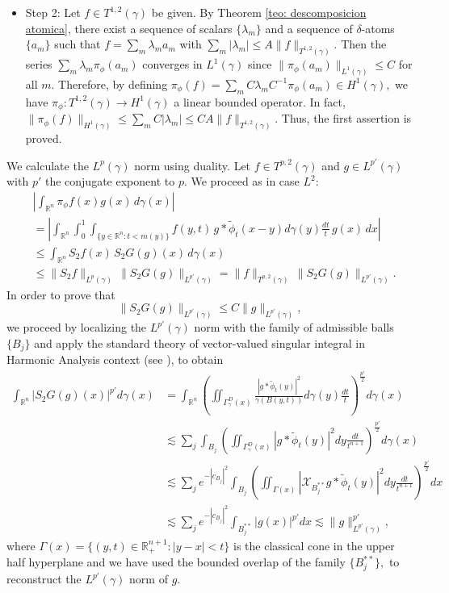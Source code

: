 \documentclass[leqno,11pt]{amsart}
\theoremstyle{plain}
\theoremstyle{remark}
\begin{document}
{{\begin{itemize}
\begin{itemize}
\end{itemize}

\item Step 2: Let $f\in T^{1,2}(\gamma)$ be given. By Theorem \ref{teo: descomposicion atomica}, there exist a sequence of scalars $\{\lambda_m\}$ and a sequence of $\delta$-atoms $\{a_m\}$ such that $f=\sum_m \lambda_m a_m$ with $\sum_m |\lambda_m|\le A \|f\|_{T^{1,2}(\gamma)}.$ Then the series $\sum_m \lambda_m \pi_\phi (a_m)$ converges in $L^1(\gamma)$ since $\|\pi_\phi(a_m)\|_{L^1(\gamma)}\le C$ for all $m.$ Therefore, by defining $\pi_\phi(f)=\sum_m C\lambda_m  C^{-1}\pi_\phi (a_m)\in H^1(\gamma),$ we have $\pi_\phi:T^{1,2}(\gamma)\to H^1(\gamma)$ a linear bounded operator. In fact, $\|\pi_\phi (f)\|_{H^1(\gamma)}\le \sum_m C|\lambda_m|\le C A \|f\|_{T^{1,2}(\gamma)}.$
Thus, the first assertion is proved.

\end{itemize}
 

 We calculate the $L^p(\gamma)$ norm using duality. Let $f\in T^{p,2}(\gamma)$ and $g\in L^{p'}(\gamma)$ with $p'$ the conjugate exponent to $p.$ We proceed as in case $L^2$:
\begin{align*}
&\left|\int_{\mathbb{R}^{n}}  \pi_\phi f(x) g(x)\, d\gamma(x)\right|\\&=\left|\int_{\mathbb{R}^n}\int_0^1 \int_{\{y\in \mathbb{R}^n: t<m(y)\}}f(y,t) \, g\ast \widetilde{\phi}_t(x-y)d\gamma(y)\frac{dt}{t}\,  g(x)\, dx\right|\\ & \le \int_{\mathbb{R}^{n}}S_{2} f (x)\, S_{2}G(g)(x)\, d\gamma(x)\\ &\le \|S_{2}f\|_{L^p(\gamma)}\, \|S_{2}G(g)\|_{L^{p'}(\gamma)}=\|f\|_{T^{p,2}(\gamma)}\, \|S_{2}G(g)\|_{L^{p'}(\gamma)}.
\end{align*}  
In order to prove that $$\|S_{2}G(g)\|_{L^{p'}(\gamma)}\le C \|g\|_{L^{p'}(\gamma)},$$ we proceed  by localizing the $L^{p'}(\gamma)$ norm with the family of admissible balls $\{B_j\}$ and apply the standard theory of vector-valued singular integral in Harmonic Analysis context (see \cite{stein}), to obtain
\begin{align*}
\int_{\mathbb{R}^n} |S_{2} G(g)(x)|^{p'}d\gamma(x)&=\int_{\mathbb{R}^n}\left(\iint_{\Gamma_\gamma^D(x)}\frac{|g\ast \widetilde{\phi}_t(y)|^2}{\gamma(B(y,t))}d\gamma(y)\frac{dt}{t}\right)^{\frac{p'}{2}}d\gamma(x)\\ &\lesssim  \sum_{j}\int_{B_j} \left( \iint_{\Gamma_\gamma^D(x) }|g\ast \widetilde{\phi}_t (y)|^2 dy \frac{dt}{t^{n+1}}\right)^{\frac{p'}{2}}d\gamma(x)
\\ & \lesssim \sum_{j} e^{-|c_{B_j}|^2} \int_{B_j}\left(\iint_{\Gamma(x)}|\mathcal{X}_{B_j^{**}} g\ast \widetilde{\phi}_t (y)|^2 dy \frac{dt}{t^{n+1}}\right)^{\frac{p'}{2}}dx\\ &\lesssim \sum_{j} e^{-|c_{B_j}|^2} \int_{B_j^{**}}|g(x)|^{p'}dx\lesssim 
\|g\|_{L^{p'}(\gamma)}^{p'},
\end{align*}
where $\Gamma(x)=\{(y,t)\in \mathbb{R}^{n+1}_+: |y-x|<t\}$ is the classical cone in the upper half hyperplane and we have used the bounded overlap of the family $\{B_j^{**}\},$ to reconstruct the $L^{p'}(\gamma)$ norm of $g.$

}}
\end{document}
